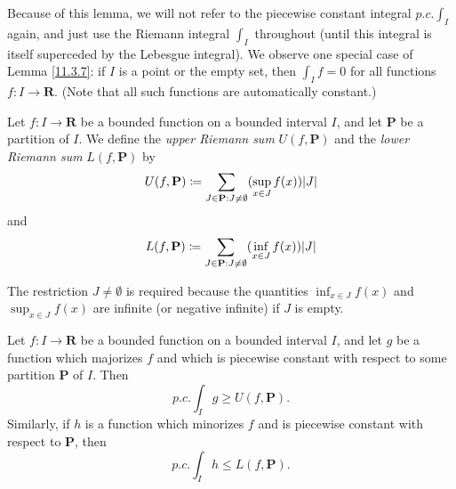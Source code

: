 \begin{remark}\label{11.3.8}
    Because of this lemma, we will not refer to the piecewise constant integral \(p.c. \int_I\) again, and just use the Riemann integral \(\int_I\) throughout
    (until this integral is itself superceded by the Lebesgue integral).
    We observe one special case of Lemma \ref{11.3.7}:
    if \(I\) is a point or the empty set, then \(\int_I f = 0\) for all functions \(f : I \to \mathbf{R}\).
    (Note that all such functions are automatically constant.)
\end{remark}

\begin{definition}\label{11.3.9}
    Let \(f : I \to \mathbf{R}\) be a bounded function on a bounded interval \(I\), and let \(\mathbf{P}\) be a partition of \(I\).
    We define the \emph{upper Riemann sum} \(U(f, \mathbf{P})\) and the \emph{lower Riemann sum} \(L(f, \mathbf{P})\) by
    \[
        U(f, \mathbf{P}) \coloneqq \sum_{J \in \mathbf{P} : J \neq \emptyset} (\sup_{x \in J} f(x)) \abs*{J}
    \]
    and
    \[
        L(f, \mathbf{P}) \coloneqq \sum_{J \in \mathbf{P} : J \neq \emptyset} (\inf_{x \in J} f(x)) \abs*{J}
    \]
\end{definition}

\begin{remark}\label{11.3.10}
    The restriction \(J \neq \emptyset\) is required because the quantities \(\inf_{x \in J} f(x)\) and \(\sup_{x \in J} f(x)\) are infinite (or negative infinite) if \(J\) is empty.
\end{remark}

\begin{lemma}\label{11.3.11}
    Let \(f : I \to \mathbf{R}\) be a bounded function on a bounded interval \(I\), and let \(g\) be a function which majorizes \(f\) and which is piecewise constant with respect to some partition \(\mathbf{P}\) of \(I\).
    Then
    \[
        p.c. \int_I g \geq U(f, \mathbf{P}).
    \]
    Similarly, if \(h\) is a function which minorizes \(f\) and is piecewise constant with respect to \(\mathbf{P}\), then
    \[
        p.c. \int_I h \leq L(f, \mathbf{P}).
    \]
\end{lemma}

